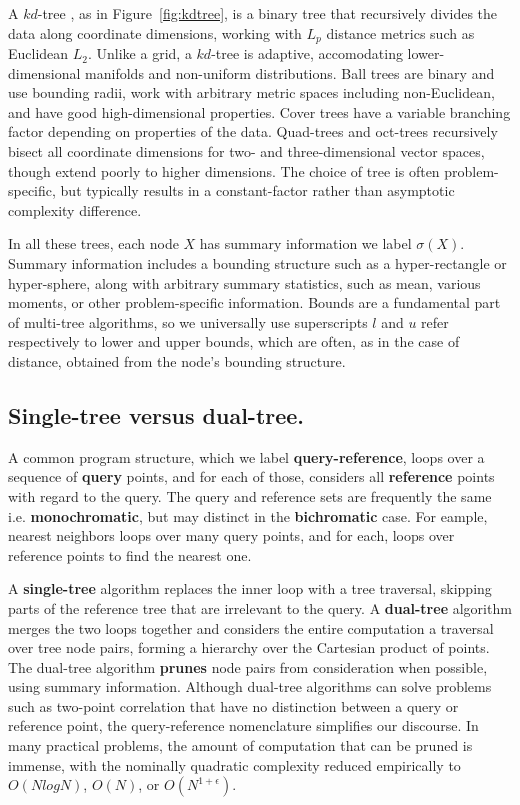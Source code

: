 \documentclass[twoside,leqno,twocolumn]{article}
\newcommand{\fig}[1]{Figure~\ref{fig:#1}}
\newcommand{\mysub}[1]{\subsection{#1.}}
\newcommand{\defterm}[1]{{\bf #1}}
\newcommand{\outstat}{\sigma}
\begin{document}
A $kd$-tree \cite{preparata_kdtrees}, as in \fig{kdtree}, is a binary tree that recursively divides the data along coordinate dimensions, working with $L_p$ distance metrics such as Euclidean $L_2$.
Unlike a grid, a $kd$-tree is adaptive, accomodating lower-dimensional manifolds and non-uniform distributions.
Ball trees \cite{anchors_balltrees_moore} are binary and use bounding radii, work with arbitrary metric spaces including non-Euclidean, and have good high-dimensional properties.
Cover trees \cite{covertrees} have a variable branching factor depending on properties of the data.
Quad-trees and oct-trees recursively bisect all coordinate dimensions for two- and three-dimensional vector spaces, though extend poorly to higher dimensions.
The choice of tree is often problem-specific, but typically results in a constant-factor rather than asymptotic complexity difference.

In all these trees, each node $X$ has summary information we label $\outstat(X)$.
Summary information includes a bounding structure such as a hyper-rectangle or hyper-sphere, along with arbitrary summary statistics, such as mean, various moments, or other problem-specific information.
Bounds are a fundamental part of multi-tree algorithms, so we universally use superscripts $l$ and $u$ refer respectively to lower and upper bounds, which are often, as in the case of distance, obtained from the node's bounding structure.

\mysub{Single-tree versus dual-tree}
A common program structure, which we label \defterm{query-reference}, loops over a sequence of \defterm{query} points, and for each of those, considers all \defterm{reference} points with regard to the query.
The query and reference sets are frequently the same i.e. \defterm{monochromatic}, but may distinct in the \defterm{bichromatic} case.
For eample, nearest neighbors loops over many query points, and for each, loops over reference points to find the nearest one.

A \defterm{single-tree} algorithm replaces the inner loop with a tree traversal, skipping parts of the reference tree that are irrelevant to the query.
A \defterm{dual-tree} algorithm merges the two loops together and considers the entire computation a traversal over tree node pairs, forming a hierarchy over the Cartesian product of points.
The dual-tree algorithm \defterm{prunes} node pairs from consideration when possible, using summary information.
Although dual-tree algorithms can solve problems such as two-point correlation that have no distinction between a query or reference point, the query-reference nomenclature simplifies our discourse.
In many practical problems, the amount of computation that can be pruned is immense, with the nominally quadratic complexity reduced empirically to $O(N log N)$, $O(N)$, or $O(N^{1+\epsilon})$.
\end{document}
